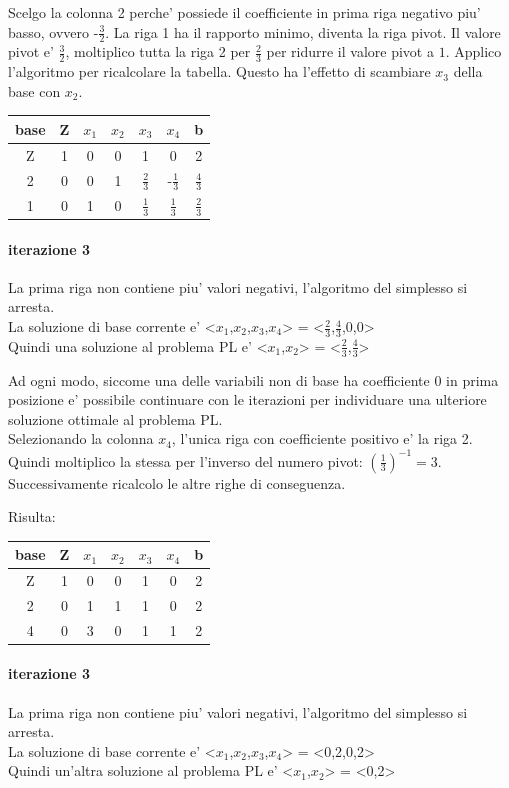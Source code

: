 \documentclass[a4paper,12pt,oneside]{article}
\begin{document}
    Scelgo la colonna 2 perche' possiede il coefficiente in prima riga negativo piu' basso, ovvero -$\frac 3 2$.
    La riga 1 ha il rapporto minimo, diventa la riga pivot.
    Il valore pivot e' $\frac 3 2$, moltiplico tutta la riga 2 per $\frac 2 3$ per ridurre il valore pivot a $1$.
    Applico l'algoritmo per ricalcolare la tabella.
    Questo ha l'effetto di scambiare $x_3$ della base con $x_2$.

    \begin{center}
        \begin{tabular}{|c|c|c|c|c|c|c|}
            \hline
            base & Z & $x_1$ & $x_2$ & $x_3$ & $x_4$ & b\\
            \hline
            Z & 1 & 0 & 0 & 1 & 0 & 2\\
            2 & 0 & 0 & 1 & $\frac 2 3$ & -$\frac 1 3$ & $\frac 4 3$\\
            1 & 0 & 1 & 0 & $\frac 1 3$ & $\frac 1 3$ & $\frac 2 3$\\
            \hline
        \end{tabular}
    \end{center}

    \paragraph{iterazione 3}

    La prima riga non contiene piu' valori negativi, l'algoritmo del simplesso si arresta. \\
    La soluzione di base corrente e' <$x_1$,$x_2$,$x_3$,$x_4$> = <$\frac 2 3$,$\frac 4 3$,0,0> \\
    Quindi una soluzione al problema PL e' <$x_1$,$x_2$> = <$\frac 2 3$,$\frac 4 3$>\*

    Ad ogni modo, siccome una delle variabili non di base ha coefficiente 0 in prima posizione e' possibile continuare con le iterazioni per individuare una ulteriore soluzione ottimale al problema PL. \\

    Selezionando la colonna $x_4$, l'unica riga con coefficiente positivo e' la riga 2. Quindi moltiplico la stessa per l'inverso del numero pivot: $(\frac 1 3)^{-1} = 3$.
    Successivamente ricalcolo le altre righe di conseguenza.

    Risulta:

    \begin{center}
        \begin{tabular}{|c|c|c|c|c|c|c|}
            \hline
            base & Z & $x_1$ & $x_2$ & $x_3$ & $x_4$ & b\\
            \hline
            Z & 1 & 0 & 0 & 1 & 0 & 2\\
            2 & 0 & 1 & 1 & 1 & 0 & 2\\
            4 & 0 & 3 & 0 & 1 & 1 & 2\\
            \hline
        \end{tabular}
    \end{center}

    \paragraph{iterazione 3}

    La prima riga non contiene piu' valori negativi, l'algoritmo del simplesso si arresta. \\
    La soluzione di base corrente e' <$x_1$,$x_2$,$x_3$,$x_4$> = <0,2,0,2> \\
    Quindi un'altra soluzione al problema PL e' <$x_1$,$x_2$> = <0,2>\*
\end{document}
